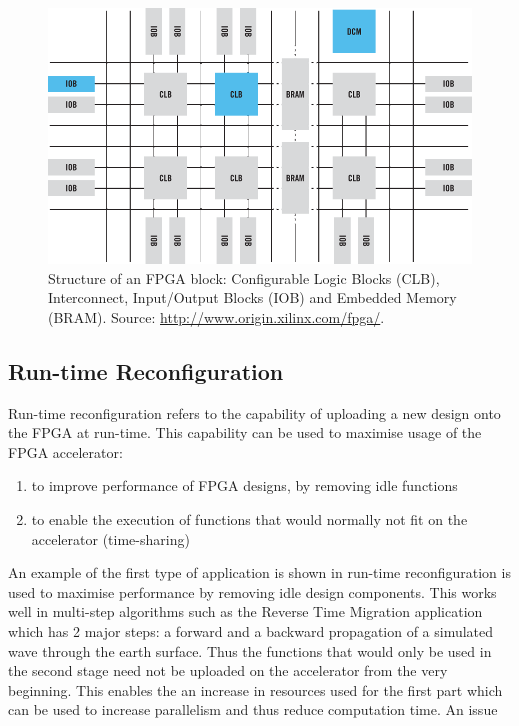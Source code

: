 \begin{figure}[ht!]
\centering
\includegraphics[scale=0.4]{figs/fpga-block-structure.png}
\caption{Structure of an FPGA block: Configurable Logic Blocks (CLB),
  Interconnect, Input/Output Blocks (IOB) and Embedded Memory (BRAM). Source:
  \url{http://www.origin.xilinx.com/fpga/}.}
\label{fig:fpga-block-structure}
\end{figure}

\subsection{Run-time Reconfiguration}


Run-time reconfiguration refers to the capability of uploading a new
design onto the FPGA at run-time. This capability can be used to
maximise usage of the FPGA accelerator:
\begin{enumerate}
\item to improve performance of FPGA designs, by removing idle functions
\item to enable the execution of functions that would normally not fit
  on the accelerator (time-sharing)
\end{enumerate}

An example of the first type of application is shown in
\cite{Xinyu:Qiwei:Luk:Qiang:Pell:2012} run-time reconfiguration is
used to maximise performance by removing idle design components. This
works well in multi-step algorithms such as the Reverse Time Migration
application which has 2 major steps: a forward and a backward
propagation of a simulated wave through the earth surface. Thus the
functions that would only be used in the second stage need not be
uploaded on the accelerator from the very beginning. This enables the
an increase in resources used for the first part which can be used to
increase parallelism and thus reduce computation time. An issue

